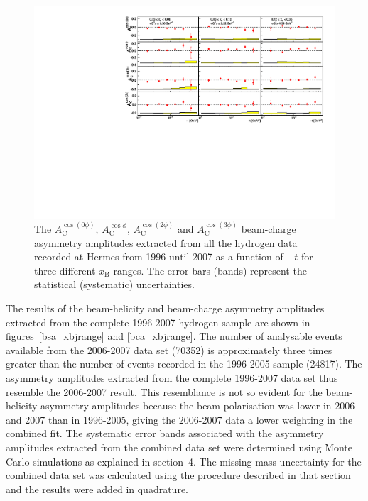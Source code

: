 \begin{figure}
  \begin{center}
    \includegraphics[width=15cm]{bcaplots_tc_xnjrange_eml_par13_bin6_9607_pic_dual}
    \caption{The $A_{\textrm{C}}^{\cos(0\phi)}$, $A_{\textrm{C}}^{\cos\phi}$, $A_{\textrm{C}}^{\cos(2\phi)}$ and $A_{\textrm{C}}^{\cos(3\phi)}$ beam-charge asymmetry amplitudes extracted from all the hydrogen data recorded at H{\sc ermes} from 1996 until 2007 as a function of $-t$ for three different $x_{\textrm{B}}$ ranges. The error bars (bands) represent the statistical (systematic) uncertainties.}
  \label{bca_xbjrange2}
 \end{center}
\end{figure}

The results of the beam-helicity and beam-charge asymmetry amplitudes extracted from the complete 1996-2007 hydrogen sample are shown in figures~\ref{bsa_xbjrange} and \ref{bca_xbjrange}. The number of analysable events available from the 2006-2007 data set (70352) is approximately three times greater than the number of events recorded in the 1996-2005 sample (24817). The  asymmetry amplitudes extracted from the complete 1996-2007 data set thus resemble the 2006-2007 result. This resemblance is not so evident for the beam-helicity asymmetry amplitudes because the beam polarisation was lower in 2006 and 2007 than in 1996-2005, giving the 2006-2007 data a lower weighting in the combined fit. The systematic error bands associated with the asymmetry amplitudes extracted from the combined data set were determined using Monte Carlo simulations as explained in section~4. The missing-mass uncertainty for the combined data set was calculated using the procedure described in that section and the results were added in quadrature.



